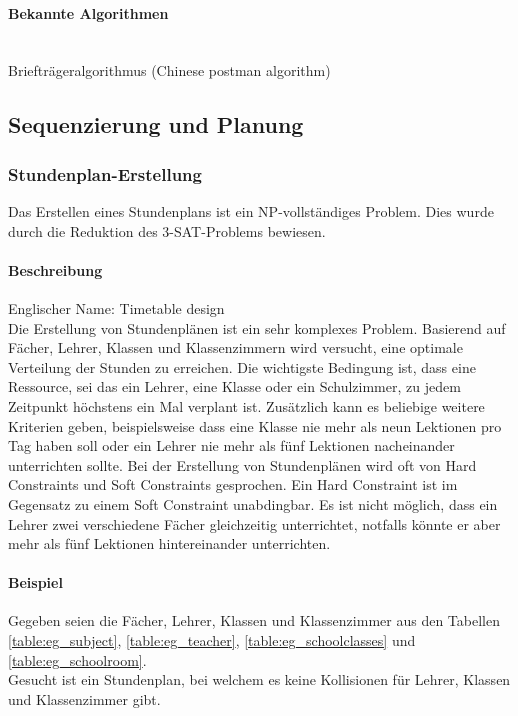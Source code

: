 	\paragraph{Bekannte Algorithmen}\mbox{}\\
	Briefträgeralgorithmus (Chinese postman algorithm) \cite{pearson2004decision}

\subsection{Sequenzierung und Planung}\label{sequencing_scheduling}

	\subsubsection{Stundenplan-Erstellung}\label{tsp}
	Das Erstellen eines Stundenplans ist ein NP-vollständiges Problem. Dies wurde durch die Reduktion des 3-SAT-Problems bewiesen.

	\paragraph{Beschreibung}
	Englischer Name: Timetable design\\
	Die Erstellung von Stundenplänen ist ein sehr komplexes Problem. Basierend auf Fächer, Lehrer, Klassen und Klassenzimmern wird versucht, eine optimale Verteilung der Stunden zu 
	erreichen. Die wichtigste Bedingung ist, dass eine Ressource, sei das ein Lehrer, eine Klasse oder ein Schulzimmer, zu jedem Zeitpunkt höchstens ein Mal verplant ist. 
	Zusätzlich kann es beliebige weitere Kriterien geben, beispielsweise dass eine Klasse nie mehr als neun Lektionen pro Tag haben soll oder ein Lehrer nie mehr als 
	fünf Lektionen nacheinander unterrichten sollte. Bei der Erstellung von Stundenplänen wird oft von Hard Constraints und Soft Constraints gesprochen. Ein Hard Constraint ist im Gegensatz zu 
	einem Soft Constraint unabdingbar. Es ist nicht möglich, dass ein Lehrer zwei verschiedene Fächer gleichzeitig unterrichtet, notfalls könnte er aber mehr als fünf Lektionen hintereinander 
	unterrichten. \cite{Abramson92aparallel} \cite{Abramson91constructingschool} \cite{framework_timetabling} \cite{time_table_constraint_opti_ea}

	\paragraph{Beispiel} Gegeben seien die Fächer, Lehrer, Klassen und Klassenzimmer aus den Tabellen \ref{table:eg_subject}, \ref{table:eg_teacher}, \ref{table:eg_schoolclasses} und \ref{table:eg_schoolroom}.\\
Gesucht ist ein Stundenplan, bei welchem es keine Kollisionen für Lehrer, Klassen und Klassenzimmer gibt.

